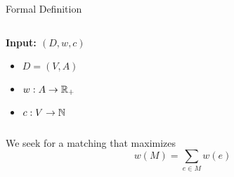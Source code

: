 \begin{frame}{Formal Definition}
\begin{columns}

\begin{column}{.45\textwidth}
\textbf{Input: $(D, w, c)$}
\begin{itemize}[<+>]
\item $D=(V,A)$
\item $w:A \to \mathbb{R}_+$
\item $c:V \to \mathbb{N}$
\end{itemize}

\end{column}

\begin{column}{.55\textwidth}
\centering

\end{column}
\end{columns}

\vfill
{}
We seek for a matching that maximizes
$$w(M) = \sum_{e \in M}{w(e)}$$

\end{frame}